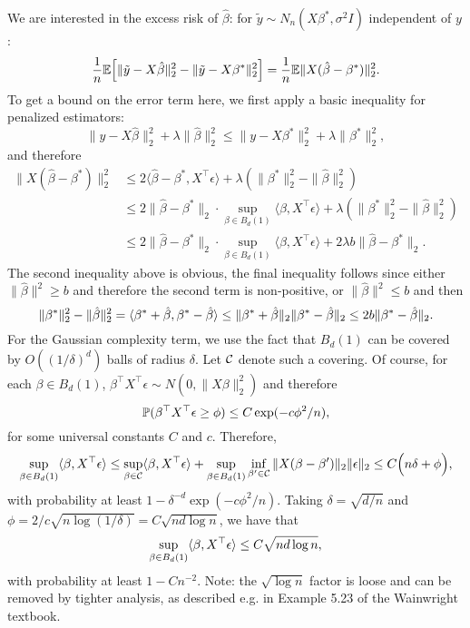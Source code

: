 \documentclass{article}
\begin{document}
	We are interested in the excess risk of $\hat{\beta}$: for $\tilde{y} \sim N_n(X\beta^{\ast}, \sigma^2 I)$ independent of $y$:
	$$
	\frac{1}{n}\E\Big[\|\tilde{y} - X\hat{\beta}\|_2^2 - \|\tilde{y} - X\beta^{\ast}\|_2^2\Big] = \frac{1}{n} \E\|X(\hat{\beta} - \beta^{\ast})\|_2^2.
	$$
	To get a bound on the error term here, we first apply a basic inequality for penalized estimators:
	$$
	\|y - X\hat{\beta}\|_2^2 + \lambda \|\hat{\beta}\|_2^2 \leq \|y - X\beta^{\ast}\|_2^2 + \lambda \|\beta^{\ast}\|_2^2,
	$$
	and therefore
	\begin{align*}
	\|X(\hat{\beta} - \beta^{\ast})\|_2^2 
	& \leq 2 \langle \hat{\beta} - \beta^{\ast}, X^{\top}\epsilon \rangle + \lambda(\|\beta^{\ast}\|_2^2 - \|\hat{\beta}\|_2^2) \\
	& \leq 2 \|\hat{\beta} - \beta^{\ast}\|_2 \cdot \sup_{\beta \in B_d(1)}\langle \beta, X^{\top}\epsilon \rangle + \lambda(\|\beta^{\ast}\|_2^2 - \|\hat{\beta}\|_2^2) \\
	& \leq 2 \|\hat{\beta} - \beta^{\ast}\|_2 \cdot \sup_{\beta \in B_d(1)}\langle \beta, X^{\top}\epsilon \rangle +  2 \lambda b \|\hat{\beta} - \beta^{\ast}\|_2.
	\end{align*}
	The second inequality above is obvious, the final inequality follows since either $\|\hat{\beta}\|^2 \geq b$ and therefore the second term is non-positive, or $\|\hat{\beta}\|^2 \leq b$ and then
	$$
	\|\beta^{\ast}\|_2^2 - \|\hat{\beta}\|_2^2 = \dotp{\beta^{\ast} + \hat{\beta}}{\beta^{\ast} - \hat{\beta}} \leq \|\beta^{\ast} + \hat{\beta}\|_2 \|\beta^{\ast} - \hat{\beta}\|_2  \leq  2b \|\beta^{\ast} - \hat{\beta}\|_2.
	$$
	For the Gaussian complexity term, we use the fact that $B_d(1)$ can be covered by $O((1/\delta)^d)$ balls of radius $\delta$. Let $\mc{C}$ denote such a covering. Of course, for each $\beta \in B_d(1)$, $\beta^{\top} X^{\top} \epsilon \sim N(0, \|X\beta\|_2^2)$ and therefore
	$$
	\P(\beta^{\top} X^{\top} \epsilon  \geq \phi ) \leq C \exp(-c \phi^2/n),
	$$
	for some universal constants $C$ and $c$. Therefore,
	$$
	\sup_{\beta \in B_d(1)} \dotp{\beta}{X^{\top} \epsilon} \leq \sup_{\beta \in \mc{C}} \dotp{\beta}{X^{\top} \epsilon} + \sup_{\beta \in B_d(1)} \inf_{\beta' \in \mc{C}} \|X(\beta - \beta')\|_2 \|\epsilon\|_2 \leq C\Big(n \delta + \phi\Big),
	$$ 
	with probability at least $1 - \delta^{-d} \exp(-c \phi^2/n)$.
	Taking $\delta = \sqrt{d/n}$ and $\phi = 2/c\sqrt{n \log(1/\delta)} = C\sqrt{n d \log n}$, we have that 
	$$
	\sup_{\beta \in B_d(1)} \dotp{\beta}{X^{\top} \epsilon} \leq C \sqrt{n d \log n},
	$$
	with probability at least $1 - Cn^{-2}$. Note: the $\sqrt{\log n}$ factor is loose and can be removed by tighter analysis, as described e.g. in Example 5.23 of the Wainwright textbook.
	
\end{document}
